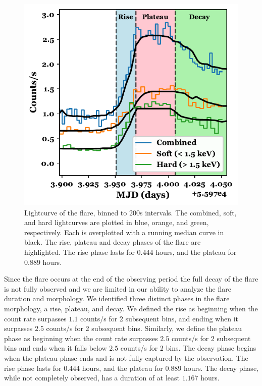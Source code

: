 \documentclass[twocolumn]{aastex631}
\begin{document}
\begin{figure}
    \centering
    \includegraphics[width=0.9\linewidth]{Figures/SU Aur/figure_flare.pdf}
    \caption{Lightcurve of the flare, binned to 200s intervals. The combined, soft, and hard lightcurves are plotted in blue, orange, and green, respectively. Each is overplotted with a running median curve in black. The rise, plateau and decay phases of the flare are highlighted. The rise phase lasts for $0.444$ hours, and the plateau for $0.889$ hours.}
    \label{fig:su_aur_flare}
\end{figure}

Since the flare occurs at the end of the observing period the full decay of the flare is not fully observed and we are limited in our ability to analyze the flare duration and morphology. We identified three distinct phases in the flare morphology, a rise, plateau, and decay. We defined the rise as beginning when the count rate surpasses $1.1$ counts/s for 2 subsequent bins, and ending when it surpasses $2.5$ counts/s for 2 subsequent bins. Similarly, we define the plateau phase as beginning when the count rate surpasses $2.5$ counts/s for 2 subsequent bins and ends when it falls below $2.5$ counts/s for 2 bins. The decay phase begins when the plateau phase ends and is not fully captured by the observation. The rise phase lasts for $0.444$ hours, and the plateau for $0.889$ hours. The decay phase, while not completely observed, has a duration of at least $1.167$ hours.
\end{document}
